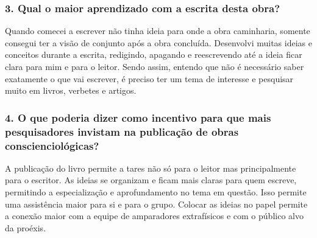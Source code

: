 \documentclass{gescons}
\begin{document}
\begin{multicols}{2}
\subsubsection{3. Qual o maior aprendizado com a escrita desta obra?}


Quando comecei a escrever não tinha ideia para onde a obra caminharia, somente consegui ter a visão de conjunto após a obra concluída. Desenvolvi muitas ideias e conceitos durante a escrita, redigindo, apagando e reescrevendo até a ideia ficar clara para mim e para o leitor. Sendo assim, entendo que não é necessário saber exatamente o que vai escrever, é preciso ter um tema de interesse e pesquisar muito em livros, verbetes e artigos.


\subsubsection{4. O que poderia dizer como incentivo para que mais pesquisadores invistam na publicação de obras conscienciológicas?}

A publicação do livro permite a tares não só para o leitor mas principalmente para o escritor. As ideias se organizam e ficam mais claras para quem escreve, permitindo a especialização e aprofundamento no tema em questão. Isso permite uma assistência maior para si e para o grupo. Colocar as ideias no papel permite a conexão maior com a equipe de amparadores extrafísicos e com o público alvo da proéxis.
    
    \end{multicols}
\end{document}
